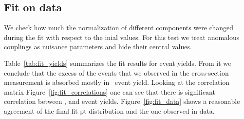 \subsection{Fit on data}
We check how much the normalization of different components were
changed during the fit with respect to the inial values. For this test
we treat anomalous couplings as nuisance parameters and hide their
central values.

Table~\ref{tab:fit_yields} summarizes the fit results for event
yields. From it we conclude that the excess of the events that we
observed in the cross-section measurement is absorbed mostly in \ww\
event yield. Looking at the correlation matrix
Figure~\ref{fig:fit_correlations} one can see that there is
significant correlation between \ww{}, \wjets{} and \ttbar{} event
yields. Figure~\ref{fig:fit_data} shows a reasonable agreement of the
final fit pt distribution and the one observed in data. 



